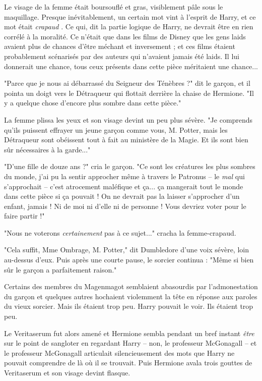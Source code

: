 Le visage de la femme était boursouflé et gras, visiblement pâle sous le maquillage. Presque inévitablement, un certain mot vint à l'esprit de Harry, et ce mot était \emph{crapaud} . Ce qui, dit la partie logique de Harry, ne devrait être en rien corrélé à la moralité. Ce n'était que dans les films de Disney que les gens laids avaient plus de chances d'être méchant et inversement ; et ces films étaient probablement scénarisés par des auteurs qui n'avaient jamais été laids. Il lui donnerait une chance, tous ceux présents dans cette pièce méritaient une chance...

"Parce que je nous ai débarrassé du Seigneur des Ténèbres ?" dit le garçon, et il pointa un doigt vers le Détraqueur qui flottait derrière la chaise de Hermione. "Il y a quelque chose d'encore plus sombre dans cette pièce."

La femme plissa les yeux et son visage devint un peu plus sévère. "Je comprends qu'ils puissent effrayer un jeune garçon comme vous, M. Potter, mais les Détraqueur sont obéissent tout à fait au ministère de la Magie. Et ils sont bien sûr nécessaires à la garde..."

"D'une fille de douze ans ?" cria le garçon. "Ce sont les créatures les plus sombres du monde, j'ai pu la sentir approcher même à travers le Patronus – le \emph{mal}  qui s'approchait – c'est atrocement maléfique et ça... ça mangerait tout le monde dans cette pièce si ça pouvait ! On ne devrait pas la laisser s'approcher d'un enfant, jamais ! Ni de moi ni d'elle ni de personne ! Vous devriez voter pour le faire partir !"

"Nous ne voterons \emph{certainement}  pas à ce sujet..." cracha la femme-crapaud.

"Cela suffit, Mme Ombrage, M. Potter," dit Dumbledore d'une voix sévère, loin au-dessus d'eux. Puis après une courte pause, le sorcier continua : "Même si bien sûr le garçon a parfaitement raison."

Certains des membres du Magenmagot semblaient abasourdis par l'admonestation du garçon et quelques autres hochaient violemment la tête en réponse aux paroles du vieux sorcier. Mais ils étaient trop peu. Harry pouvait le voir. Ils étaient trop peu.

Le Veritaserum fut alors amené et Hermione sembla pendant un bref instant \emph{être}  sur le point de sangloter en regardant Harry – non, le professeur McGonagall – et le professeur McGonagall articulait silencieusement des mots que Harry ne pouvait comprendre de là où il se trouvait. Puis Hermione avala trois gouttes de Veritaserum et son visage devint flasque.

